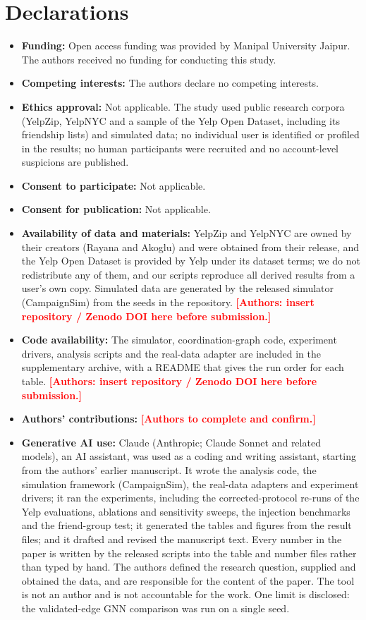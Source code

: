 \documentclass[pdflatex,sn-basic]{sn-jnl}
\theoremstyle{thmstyleone}
\theoremstyle{thmstylethree}
\newcommand{\todo}[1]{\textcolor{red}{\textbf{[#1]}}}
\begin{document}
\section*{Declarations}
\begin{itemize}
\item \textbf{Funding:} Open access funding was provided by Manipal University Jaipur. The authors received no funding for conducting this study.
\item \textbf{Competing interests:} The authors declare no competing interests.
\item \textbf{Ethics approval:} Not applicable. The study used public research corpora (YelpZip, YelpNYC and a sample of the Yelp Open Dataset, including its friendship lists) and simulated data; no individual user is identified or profiled in the results; no human participants were recruited and no account-level suspicions are published.
\item \textbf{Consent to participate:} Not applicable.
\item \textbf{Consent for publication:} Not applicable.
\item \textbf{Availability of data and materials:} YelpZip and YelpNYC are owned by their creators (Rayana and Akoglu) and were obtained from their release, and the Yelp Open Dataset is provided by Yelp under its dataset terms; we do not redistribute any of them, and our scripts reproduce all derived results from a user's own copy. Simulated data are generated by the released simulator (CampaignSim) from the seeds in the repository. \todo{Authors: insert repository / Zenodo DOI here before submission.}
\item \textbf{Code availability:} The simulator, coordination-graph code, experiment drivers, analysis scripts and the real-data adapter are included in the supplementary archive, with a README that gives the run order for each table. \todo{Authors: insert repository / Zenodo DOI here before submission.}
\item \textbf{Authors' contributions:} \todo{Authors to complete and confirm.}
\item \textbf{Generative AI use:} Claude (Anthropic; Claude Sonnet and related models), an AI assistant, was used as a coding and writing assistant, starting from the authors' earlier manuscript. It wrote the analysis code, the simulation framework (CampaignSim), the real-data adapters and experiment drivers; it ran the experiments, including the corrected-protocol re-runs of the Yelp evaluations, ablations and sensitivity sweeps, the injection benchmarks and the friend-group test; it generated the tables and figures from the result files; and it drafted and revised the manuscript text. Every number in the paper is written by the released scripts into the table and number files rather than typed by hand. The authors defined the research question, supplied and obtained the data, and are responsible for the content of the paper. The tool is not an author and is not accountable for the work. One limit is disclosed: the validated-edge GNN comparison was run on a single seed.
\end{itemize}
\end{document}
